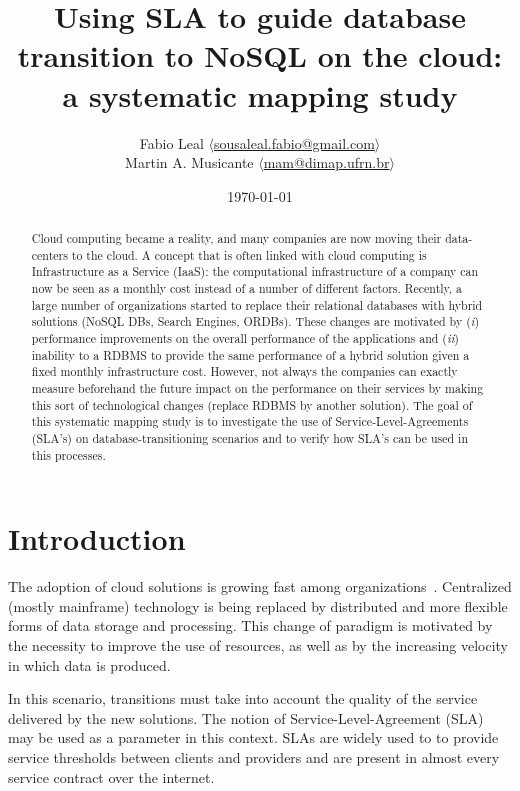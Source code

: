 \documentclass{article}
\begin{document}
\title{Using SLA to guide database transition to NoSQL on the cloud: a systematic mapping study}
\author{Fabio Leal $\langle$\href{mailto:sousaleal.fabio@gmail.com}%
{sousaleal.fabio@gmail.com}$\rangle$
\\
Martin A. Musicante $\langle$\href{mailto:mam@dimap.ufrn.br}%
{mam@dimap.ufrn.br}$\rangle$}
\date{\today}
\maketitle  




\begin{abstract}
Cloud computing became a reality, and many companies are now moving their data-centers to the cloud. 
A concept that is often linked with cloud computing is Infrastructure as a Service (IaaS): the computational infrastructure of a company can now be seen as a monthly cost instead of a number of different factors. 
Recently, a large number of organizations started to replace their relational databases with hybrid solutions (NoSQL DBs, Search Engines, ORDBs). 
These changes are motivated by (\textit{i}) performance improvements on the overall performance of the applications and (\textit{ii}) inability to a RDBMS to provide the same performance of a hybrid solution given a fixed monthly infrastructure cost. 
However, not always the companies can exactly measure beforehand the future impact on the performance on their services by making this sort of technological changes (replace RDBMS by another solution). 
The goal of this systematic mapping study is to investigate the use of Service-Level-Agreements (SLA’s) on database-transitioning scenarios and to verify how SLA’s can be used in this processes.
\end{abstract}

\section{Introduction}

The adoption of cloud solutions is growing fast among organizations~\cite{6546068}.
Centralized (mostly mainframe) technology is being replaced by distributed and more flexible forms of data storage and processing.
This change of paradigm is motivated by the necessity to improve the use of resources, as well as by the increasing velocity in which data is produced.

In this scenario, transitions must take into account the quality of the service delivered by the new solutions.
The notion of Service-Level-Agreement (SLA)~\cite{6253526} may be used as a parameter in this context. SLAs are widely used to to provide service thresholds between clients and providers and are present in almost every service contract over the internet. 
\end{document}
